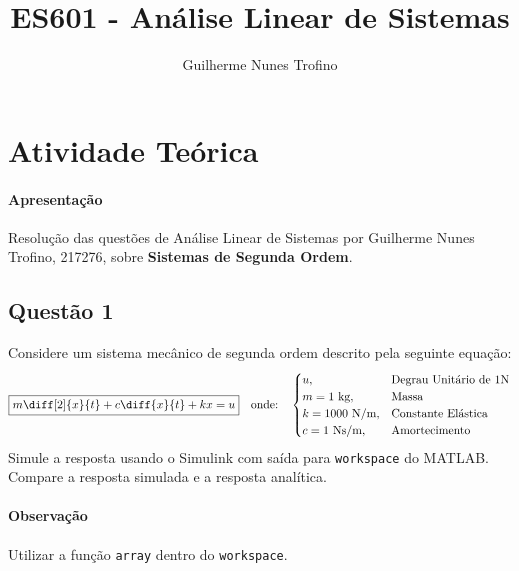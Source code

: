 \documentclass{article}
\title{ES601 - Análise Linear de Sistemas}
\author{Guilherme Nunes Trofino}
\begin{document}
    \maketitle
\newpage

    \section{Atividade Teórica}
        \paragraph{Apresentação}Resolução das questões de Análise Linear de Sistemas por Guilherme Nunes Trofino, 217276, sobre \textbf{Sistemas de Segunda Ordem}.

        \subsection{Questão 1}
            \begin{exercise}
                Considere um sistema mecânico de segunda ordem descrito pela seguinte equação:
                    \begin{equation}
                        \boxed{
                            m\diff[2]{x}{t} + 
                            c\diff{x}{t} +
                            kx = 
                            u
                        }
                        \quad
                        \text{onde:}
                        \quad
                        \begin{cases}
                            u,                   & \text{Degrau Unitário de 1N}\\
                            m = 1\text{ kg},     & \text{Massa}\\
                            k = 1000\text{ N/m}, & \text{Constante Elástica}\\
                            c = 1\text{ Ns/m},   & \text{Amortecimento}\\
                        \end{cases}
                    \end{equation}
                Simule a resposta usando o Simulink com saída para \texttt{workspace} do MATLAB. Compare a resposta simulada e a resposta analítica.

                \paragraph{Observação}Utilizar a função \texttt{array} dentro do \texttt{workspace}.
            \end{exercise}
\end{document}
